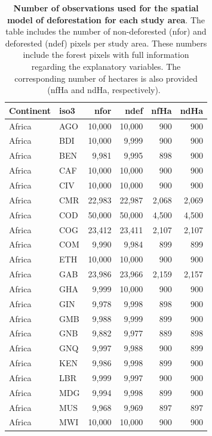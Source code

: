 \documentclass[12pt,]{article}
\begin{document}
\begin{longtable}[t]{llrrrr}
\caption{\label{tab:samp-size}\textbf{Number of observations used for the spatial model of deforestation for each study area}. The table includes the number of non-deforested (nfor) and deforested (ndef) pixels per study area. These numbers include the forest pixels with full information regarding the explanatory variables. The corresponding number of hectares is also provided (nfHa and ndHa, respectively).\vspace{0.5cm}~}\\
\toprule
Continent & iso3 & nfor & ndef & nfHa & ndHa\\
\midrule
\rowcolor{gray!6}  Africa & AGO & 10,000 & 10,000 & 900 & 900\\
Africa & BDI & 10,000 & 9,999 & 900 & 900\\
\rowcolor{gray!6}  Africa & BEN & 9,981 & 9,995 & 898 & 900\\
Africa & CAF & 10,000 & 10,000 & 900 & 900\\
\rowcolor{gray!6}  Africa & CIV & 10,000 & 10,000 & 900 & 900\\
Africa & CMR & 22,983 & 22,987 & 2,068 & 2,069\\
\rowcolor{gray!6}  Africa & COD & 50,000 & 50,000 & 4,500 & 4,500\\
Africa & COG & 23,412 & 23,411 & 2,107 & 2,107\\
\rowcolor{gray!6}  Africa & COM & 9,990 & 9,984 & 899 & 899\\
Africa & ETH & 10,000 & 10,000 & 900 & 900\\
\rowcolor{gray!6}  Africa & GAB & 23,986 & 23,966 & 2,159 & 2,157\\
Africa & GHA & 9,999 & 10,000 & 900 & 900\\
\rowcolor{gray!6}  Africa & GIN & 9,978 & 9,998 & 898 & 900\\
Africa & GMB & 9,988 & 9,999 & 899 & 900\\
\rowcolor{gray!6}  Africa & GNB & 9,882 & 9,977 & 889 & 898\\
Africa & GNQ & 9,997 & 9,988 & 900 & 899\\
\rowcolor{gray!6}  Africa & KEN & 9,986 & 9,998 & 899 & 900\\
Africa & LBR & 9,999 & 9,997 & 900 & 900\\
\rowcolor{gray!6}  Africa & MDG & 9,994 & 9,998 & 899 & 900\\
Africa & MUS & 9,968 & 9,969 & 897 & 897\\
\rowcolor{gray!6}  Africa & MWI & 10,000 & 10,000 & 900 & 900\\

\end{longtable}
\end{document}

